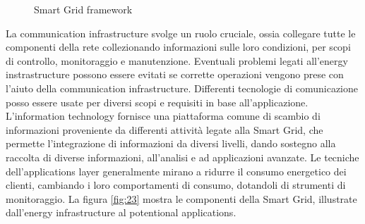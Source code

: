 \begin{figure}[h] 
\caption{Smart Grid framework}\label{fig:22}
\end{figure}

La communication infrastructure svolge un ruolo cruciale, ossia collegare tutte le componenti della rete collezionando informazioni sulle loro condizioni, per scopi di controllo, monitoraggio e manutenzione. Eventuali problemi legati all'energy instrastructure possono essere evitati se corrette operazioni vengono prese con l'aiuto della communication infrastructure. 
\newline 
Differenti tecnologie di comunicazione posso essere usate per diversi scopi e requisiti in base all'applicazione. L'information technology fornisce una piattaforma comune di scambio di informazioni proveniente da differenti attività legate alla Smart Grid, che permette l'integrazione di informazioni da diversi livelli, dando sostegno alla raccolta di diverse informazioni, all'analisi e ad applicazioni avanzate.
\newline
Le tecniche dell'applications layer generalmente mirano a ridurre il consumo energetico dei clienti, cambiando i loro comportamenti di consumo, dotandoli di strumenti di monitoraggio.    
\newline
La figura \ref{fig:23} mostra le componenti della Smart Grid, illustrate dall'energy infrastructure al potentional applications.

